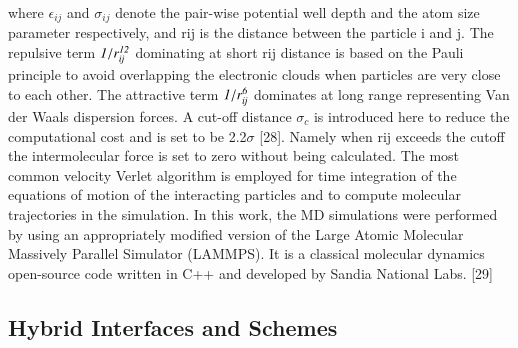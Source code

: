 \documentclass[preprint,12pt]{elsarticle}
\newcommand{\Nkimnote}[1]{ {\textcolor{blue} { ***NKim: #1 }}}
\newcommand{\Nkimnote}[1]{}
\begin{document}

where  $\epsilon_{ij}$ and $\sigma_{ij}$ denote the pair-wise potential well depth and the atom size parameter respectively, and rij is the distance between the particle i and j. The repulsive term $\it 1/r_{ij}^{12}$ dominating at short rij distance is based on the Pauli principle to avoid overlapping the electronic clouds when particles are very close to each other. The attractive term $\it 1/r_{ij}^{6}$ dominates at long range representing Van der Waals dispersion forces. A cut-off distance $\sigma_{c}$  is introduced here to reduce the computational cost and is set to be 2.2$\sigma$  [28]. Namely when rij exceeds the cutoff the intermolecular force is set to zero without being calculated.
The most common velocity Verlet algorithm is employed for time integration of the equations of motion of the interacting particles and to compute molecular trajectories in the simulation. 
In this work, the MD simulations were performed by using an appropriately modified version of the Large Atomic Molecular Massively Parallel Simulator (LAMMPS). It is a classical molecular dynamics open-source code written in C++ and developed by Sandia National Labs. [29]


\subsection{Hybrid Interfaces and Schemes}
\end{document}
